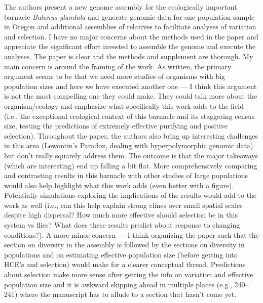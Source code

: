 \begin{itquote}
The authors present a new genome assembly for the ecologically important
barnacle \emph{Balanus glandula} and generate genomic data for one
population sample in Oregon and additional assemblies of relatives to
facilitate analyses of variation and selection. I have no major concerns
about the methods used in the paper and appreciate the significant effort
invested to assemble the genome and execute the analyses. The paper is
clear and the methods and supplement are thorough. My main concern is
around the framing of the work. As written, the primary argument seems to
be that we need more studies of organisms with big population sizes and
here we have executed another one --- I think this argument is not the
most compelling one they could make. They could talk more about the
organism/ecology and emphasize what specifically this work adds to the
field (i.e., the exceptional ecological context of this barnacle and its
staggering census size, testing the predictions of extremely effective
purifying and positive selection). Throughout the paper, the authors also
bring up interesting challenges in this area (Lewontin's Paradox, dealing
with hyperpolymorphic genomic data) but don't really squarely address
them. The outcome is that the major takeaways (which are interesting) end
up falling a bit flat. More comprehensively comparing and contrasting
results in this barnacle with other studies of large populations would
also help highlight what this work adds (even better with a figure).
Potentially simulations exploring the implications of the results would
add to the work as well (i.e., can this help explain strong clines over
small spatial scales despite high dispersal? How much more effective
should selection be in this system vs flies? What does these results
predict about response to changing conditions?). A more minor concern ---
I think organizing the paper such that the section on diversity in the
assembly is followed by the sections on diversity in populations and on
estimating effective population size (before getting into HCE's and
selection) would make for a clearer conceptual thread. Predictions about
selection make more sense after getting the info on variation and
effective population size and it is awkward skipping ahead in multiple
places (e.g., 240--241) where the manuscript has to allude to a section
that hasn't come yet.
\end{itquote}


